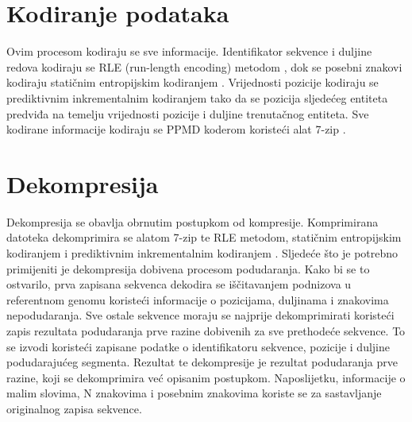 \section{Kodiranje podataka}
Ovim procesom kodiraju se sve informacije. Identifikator sekvence i duljine redova kodiraju se RLE (run-length encoding) metodom \cite{hrcm}, dok se posebni znakovi kodiraju statičnim entropijskim kodiranjem \cite{hrcm}. Vrijednosti pozicije kodiraju se prediktivnim inkrementalnim kodiranjem \cite{hrcm} tako da se pozicija sljedećeg entiteta predviđa na temelju vrijednosti pozicije i duljine trenutačnog entiteta. Sve kodirane informacije kodiraju se PPMD koderom koristeći alat 7-zip \cite{7z}.

\section{Dekompresija}
Dekompresija se obavlja obrnutim postupkom od kompresije. Komprimirana datoteka dekomprimira se alatom 7-zip te RLE metodom, statičnim entropijskim kodiranjem \cite{hrcm} i prediktivnim inkrementalnim kodiranjem \cite{hrcm}. Sljedeće što je potrebno primijeniti je dekompresija dobivena procesom podudaranja. Kako bi se to ostvarilo, prva zapisana sekvenca dekodira se iščitavanjem podnizova u referentnom genomu koristeći informacije o pozicijama, duljinama i znakovima nepodudaranja. Sve ostale sekvence moraju se najprije dekomprimirati koristeći zapis rezultata podudaranja prve razine dobivenih za sve prethodeće sekvence. To se izvodi koristeći zapisane podatke o identifikatoru sekvence, pozicije i duljine podudarajućeg segmenta. Rezultat te dekompresije je rezultat podudaranja prve razine, koji se dekomprimira već opisanim postupkom. Naposlijetku, informacije o malim slovima, N znakovima i posebnim znakovima koriste se za sastavljanje originalnog zapisa sekvence.

